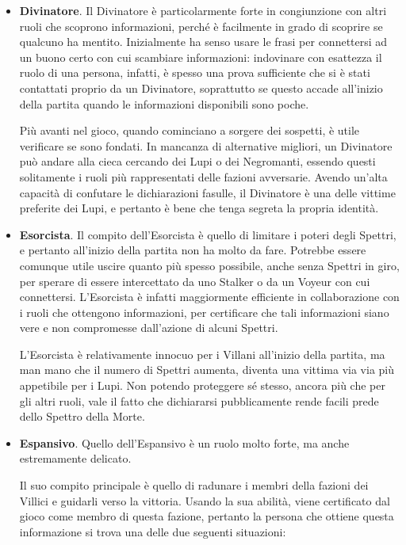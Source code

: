 \documentclass[a4paper,10pt]{article}
\begin{document}
\begin{itemize}
	\item {\bf Divinatore}. Il Divinatore è particolarmente forte in congiunzione con altri ruoli che scoprono informazioni, perché è facilmente in grado di scoprire se qualcuno ha mentito. Inizialmente ha senso usare le frasi per connettersi ad un buono certo con cui scambiare informazioni: indovinare con esattezza il ruolo di una persona, infatti, è spesso una prova sufficiente che si è stati contattati proprio da un Divinatore, soprattutto se questo accade all'inizio della partita quando le informazioni disponibili sono poche.
	
	Più avanti nel gioco, quando cominciano a sorgere dei sospetti, è utile verificare se sono fondati. In mancanza di alternative migliori, un Divinatore può andare alla cieca cercando dei Lupi o dei Negromanti, essendo questi solitamente i ruoli più rappresentati delle fazioni avversarie. Avendo un'alta capacità di confutare le dichiarazioni fasulle, il Divinatore è una delle vittime preferite dei Lupi, e pertanto è bene che tenga segreta la propria identità.
	
	\item {\bf Esorcista}. Il compito dell'Esorcista è quello di limitare i poteri degli Spettri, e pertanto all'inizio della partita non ha molto da fare. Potrebbe essere comunque utile uscire quanto più spesso possibile, anche senza Spettri in giro, per sperare di essere intercettato da uno Stalker o da un Voyeur con cui connettersi. L'Esorcista è infatti maggiormente efficiente in collaborazione con i ruoli che ottengono informazioni, per certificare che tali informazioni siano vere e non compromesse dall'azione di alcuni Spettri.
	
	L'Esorcista è relativamente innocuo per i Villani all'inizio della partita, ma man mano che il numero di Spettri aumenta, diventa una vittima via via più appetibile per i Lupi. Non potendo proteggere sé stesso, ancora più che per gli altri ruoli, vale il fatto che dichiararsi pubblicamente rende facili prede dello Spettro della Morte.
	
	\item {\bf Espansivo}. Quello dell'Espansivo è un ruolo molto forte, ma anche estremamente delicato. 
	
	Il suo compito principale è quello di radunare i membri della fazioni dei Villici e guidarli verso la vittoria. Usando la sua abilità, viene certificato dal gioco come membro di questa fazione, pertanto 
	la persona che ottiene questa informazione si trova una delle due seguenti situazioni:
	

\end{itemize}
\end{document}
